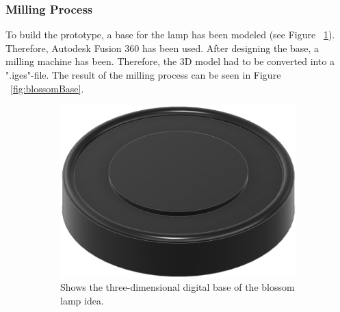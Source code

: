\documentclass[04.3_buildingProcess.tex]{subfiles}
\begin{document}
    \subsubsection{Milling Process}
    \begin{flushleft}
        To build the prototype, a base for the lamp has been modeled (see Figure ~\ref{fig:blossomBaseModel}). 
        Therefore, Autodesk Fusion 360 \cite{autodeskFusion360} has been used. After designing the base, a 
        milling machine has been. Therefore, the 3D model had to be converted into a ".iges"-file.
        The result of the milling process can be seen in Figure ~\ref{fig:blossomBase}.

        \begin{figure}[H]
            \centering
            \begin{subfigure}{.45\textwidth}
                \centering
                \includegraphics[scale=0.286]{images/materialProcess/FlowerLamp.png}
                \caption{Shows the three-dimensional digital base of the blossom lamp idea.}
                \label{fig:blossomBaseModel}
                \vspace{6mm}
            \end{subfigure}
            \hspace{1mm}
            \begin{subfigure}{.45\textwidth}
                \centering

\end{subfigure}
\end{figure}
\end{flushleft}
\end{document}
